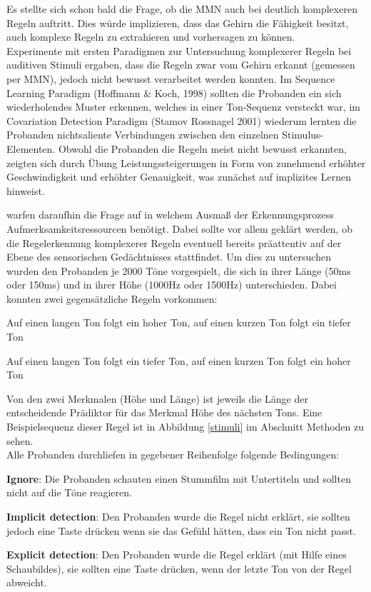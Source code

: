 \documentclass[doc,a4paper,12pt]{apa6}
\begin{document}
Es stellte sich schon bald die Frage, ob die MMN auch bei deutlich komplexeren Regeln auftritt. Dies würde implizieren, dass das Gehirn die Fähigkeit besitzt, auch komplexe Regeln zu extrahieren und vorhersagen zu können.\\
Experimente mit ersten Paradigmen zur Untersuchung komplexerer Regeln bei auditiven Stimuli ergaben, dass die Regeln zwar vom Gehirn erkannt (gemessen per MMN), jedoch nicht bewusst verarbeitet werden konnten. Im Sequence Learning Paradigm (Hoffmann \& Koch, 1998) sollten die Probanden ein sich wiederholendes Muster erkennen, welches in einer Ton-Sequenz versteckt war, im Covariation Detection Paradigm (Stamov Rossnagel 2001) wiederum lernten die Probanden nichtsaliente Verbindungen zwischen den einzelnen Stimulus-Elementen. Obwohl die Probanden die Regeln meist nicht bewusst erkannten, zeigten sich durch Übung Leistungssteigerungen in Form von zunehmend erhöhter Geschwindigkeit und erhöhter Genauigkeit, was zunächst auf implizites Lernen hinweist.

\textcite{paavilainen2007preattentive} warfen daraufhin die Frage auf in welchem Ausmaß der Erkennungsprozess Aufmerksamkeitsressourcen benötigt. Dabei sollte vor allem geklärt werden, ob die Regelerkennung komplexerer Regeln eventuell bereits präattentiv auf der Ebene des sensorischen Gedächtnisses stattfindet. Um dies zu untersuchen wurden den Probanden je 2000 Töne vorgespielt, die sich in ihrer Länge (50ms oder 150ms) und in ihrer Höhe (1000Hz oder 1500Hz) unterschieden. Dabei konnten zwei gegensätzliche Regeln vorkommen:

\begin{compactitem}
  \item Auf einen langen Ton folgt ein hoher Ton, auf einen kurzen Ton folgt ein tiefer
Ton
  \item Auf einen langen Ton folgt ein tiefer Ton, auf einen kurzen Ton folgt ein hoher
Ton
\end{compactitem}

Von den zwei Merkmalen (Höhe und Länge) ist jeweils die Länge der entscheidende Prädiktor für das Merkmal Höhe des nächsten Tons. Eine Beispielsequenz dieser Regel ist in Abbildung \ref{stimuli} im Abschnitt Methoden zu sehen.\\
Alle Probanden durchliefen in gegebener Reihenfolge folgende Bedingungen:

\begin{compactitem}
  \item \textbf{Ignore}: Die Probanden schauten einen Stummfilm mit Untertiteln und sollten nicht auf die Töne reagieren.
  \item \textbf{Implicit detection}: Den Probanden wurde die Regel nicht erklärt, sie sollten jedoch eine Taste drücken wenn sie das Gefühl hätten, dass ein Ton nicht passt.
  \item \textbf{Explicit detection}: Den Probanden wurde die Regel erklärt (mit Hilfe eines Schaubildes), sie sollten eine Taste drücken, wenn der letzte Ton von der Regel abweicht.
\end{compactitem}
\end{document}
